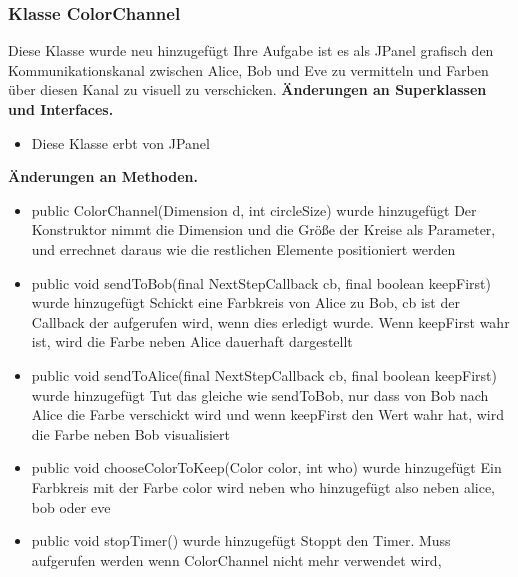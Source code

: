 \documentclass{article}
\begin{document}
	\subsubsection{Klasse ColorChannel}
    Diese Klasse wurde neu hinzugefügt
    Ihre Aufgabe ist es als JPanel grafisch den
    Kommunikationskanal zwischen Alice, Bob und Eve
    zu vermitteln und Farben über diesen Kanal zu visuell
    zu verschicken.
	    \textbf{Änderungen an Superklassen und Interfaces.}\newline
	   \begin{itemize}
            \item Diese Klasse erbt von JPanel\newline
           \end{itemize}
    \textbf{Änderungen an Methoden.}\newline
	   \begin{itemize}
           \item public ColorChannel(Dimension d, int circleSize) wurde hinzugefügt\newline
               Der Konstruktor nimmt die Dimension und die Größe der Kreise als Parameter,
               und errechnet daraus wie die restlichen Elemente positioniert werden
           \item public void sendToBob(final NextStepCallback cb, final boolean keepFirst) wurde hinzugefügt\newline
               Schickt eine Farbkreis von Alice zu Bob, cb ist der Callback der aufgerufen wird, wenn dies
               erledigt wurde.
               Wenn keepFirst wahr ist, wird die Farbe neben Alice dauerhaft dargestellt
           \item public void sendToAlice(final NextStepCallback cb, final boolean keepFirst) wurde hinzugefügt\newline
               Tut das gleiche wie sendToBob, nur dass von Bob nach Alice die Farbe verschickt wird und
               wenn keepFirst den Wert wahr hat, wird die Farbe neben Bob visualisiert
           \item public void chooseColorToKeep(Color color, int who) wurde hinzugefügt\newline
               Ein Farbkreis mit der Farbe color wird neben who hinzugefügt also neben alice, bob oder eve
           \item public void stopTimer() wurde hinzugefügt\newline
               Stoppt den Timer. Muss aufgerufen werden wenn ColorChannel nicht mehr verwendet wird,

\end{itemize}
\end{document}
